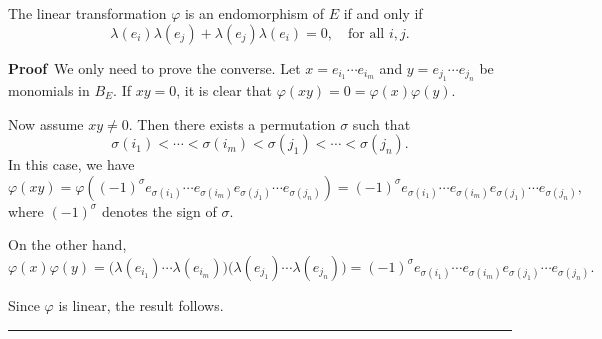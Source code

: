 \documentclass[10pt,a4paper]{amsart}
\newenvironment{proof}[1][Proof]{\noindent\textbf{#1\,} }{\hfill \rule{0.5em}{0.5em}\medskip}
\begin{document}
	\begin{lemma}\label{linear trans for end}
		The linear transformation $\varphi$ is an endomorphism of $E$ if and only if 
		\[
		\lambda(e_{i})\lambda(e_{j}) + \lambda(e_{j})\lambda(e_{i}) = 0, \quad \text{for all } i, j.
		\]
	\end{lemma}

	\begin{proof}
		We only need to prove the converse.  
		Let $x = e_{i_1}\cdots e_{i_m}$ and $y = e_{j_1}\cdots e_{j_n}$ be monomials in $B_E$. If $xy = 0$, it is clear that $\varphi(xy) = 0 = \varphi(x)\varphi(y)$.  
		
		Now assume $xy \neq 0$. Then there exists a permutation $\sigma$ such that
		\[
		\sigma(i_1) < \cdots < \sigma(i_m) < \sigma(j_1) < \cdots < \sigma(j_n).
		\] 
		In this case, we have
		\[
		\varphi(xy) 
		= \varphi\!\left((-1)^{\sigma} e_{\sigma(i_1)} \cdots e_{\sigma(i_m)} e_{\sigma(j_1)} \cdots e_{\sigma(j_n)}\right) 
		= (-1)^{\sigma} e_{\sigma(i_1)} \cdots e_{\sigma(i_m)} e_{\sigma(j_1)} \cdots e_{\sigma(j_n)},
		\]
		where $(-1)^{\sigma}$ denotes the sign of $\sigma$.  
		
		On the other hand,
		\[
		\varphi(x)\varphi(y) 
		= \big(\lambda(e_{i_1}) \cdots \lambda(e_{i_m})\big)\big(\lambda(e_{j_1}) \cdots \lambda(e_{j_n})\big) 
		= (-1)^{\sigma} e_{\sigma(i_1)} \cdots e_{\sigma(i_m)} e_{\sigma(j_1)} \cdots e_{\sigma(j_n)}.
		\]
		
		Since $\varphi$ is linear, the result follows.
	\end{proof}
\end{document}
